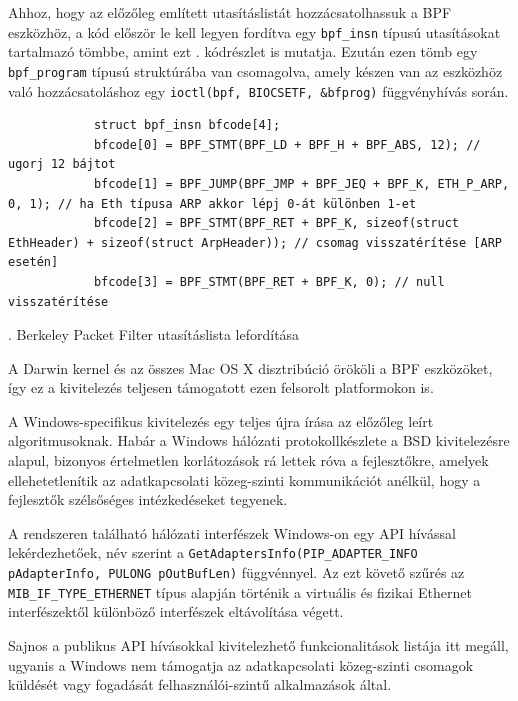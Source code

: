 \documentclass[a4paper,12pt]{article}
\newcounter{subsubsubsection}[subsubsection]
\begin{document}
	Ahhoz, hogy az előzőleg említett utasításlistát hozzácsatolhassuk a BPF eszközhöz, a kód először le kell legyen fordítva egy \texttt{bpf_insn} típusú utasításokat tartalmazó tömbbe, amint ezt \az{\ref{bpfcpp}}. kódrészlet is mutatja. Ezután ezen tömb egy \texttt{bpf_program} típusú struktúrába van csomagolva, amely készen van az eszközhöz való hozzácsatoláshoz egy \texttt{ioctl(bpf, BIOCSETF, &bfprog)} függvényhívás során.
	
	\begin{listing}[H]
		\begin{verbatim}
			struct bpf_insn bfcode[4];
			bfcode[0] = BPF_STMT(BPF_LD + BPF_H + BPF_ABS, 12); // ugorj 12 bájtot
			bfcode[1] = BPF_JUMP(BPF_JMP + BPF_JEQ + BPF_K, ETH_P_ARP, 0, 1); // ha Eth típusa ARP akkor lépj 0-át különben 1-et
			bfcode[2] = BPF_STMT(BPF_RET + BPF_K, sizeof(struct EthHeader) + sizeof(struct ArpHeader)); // csomag visszatérítése [ARP esetén]
			bfcode[3] = BPF_STMT(BPF_RET + BPF_K, 0); // null visszatérítése
		\end{verbatim}
		\caption{\Az{\ref{bpfasm}}. Berkeley Packet Filter utasításlista lefordítása}
		\label{bpfcpp}
	\end{listing}
	
	A Darwin kernel és az összes Mac OS X disztribúció örököli a BPF eszközöket, így ez a kivitelezés teljesen támogatott ezen felsorolt platformokon is.


	A Windows-specifikus kivitelezés egy teljes újra írása az előzőleg leírt algoritmusoknak. Habár a Windows hálózati protokollkészlete a BSD kivitelezésre alapul, bizonyos értelmetlen korlátozások rá lettek róva a fejlesztőkre, amelyek ellehetetlenítik az adatkapcsolati közeg-szinti kommunikációt anélkül, hogy a fejlesztők szélsőséges intézkedéseket tegyenek.
	
	A rendszeren található hálózati interfészek Windows-on egy API hívással lekérdezhetőek, név szerint a \texttt{GetAdaptersInfo(PIP_ADAPTER_INFO pAdapterInfo, PULONG pOutBufLen)} függvénnyel. Az ezt követő szűrés az \texttt{MIB_IF_TYPE_ETHERNET} típus alapján történik a virtuális és fizikai Ethernet interfészektől különböző interfészek eltávolítása végett.
	
	Sajnos a publikus API hívásokkal kivitelezhető funkcionalitások listája itt megáll, ugyanis a Windows nem támogatja az adatkapcsolati közeg-szinti csomagok küldését vagy fogadását felhasználói-szintű alkalmazások által.
	
\end{document}
